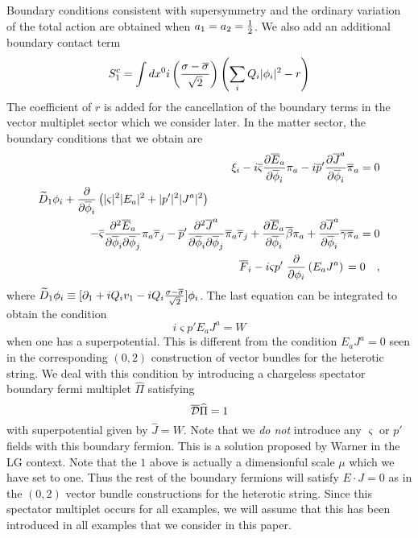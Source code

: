 \documentclass[a4paper,12pt]{article}
\begin{document}
Boundary conditions consistent with supersymmetry and the ordinary
variation of the total action are obtained when
$a_1=a_2={1\over2}$. We also add an additional boundary
contact term 
\begin{equation}
S_1^c = \int dx^0 i \left({{\sigma -
\overline{\sigma}}\over{\sqrt2}} \right) \left(\sum_i Q_i |\phi_i|^2
-r\right)
\end{equation}
The coefficient of $r$ is added for the
cancellation of the boundary terms in the vector multiplet sector which
we consider later.
In the matter sector, the boundary conditions that we obtain are
\begin{eqnarray}
&&\xi_i -i \overline{\varsigma}
{{\partial \overline{E}_a}\over{\partial\overline{\phi}_i}} \pi_a 
-i\overline{p}'{{\partial \overline{J}^a}\over{\partial\overline{\phi}_i}} 
\overline{\pi}_a =0 \label{genbca} \\
%
\lefteqn{
\widetilde{D}_1 \phi_i + {\partial\over{\partial\overline{\phi}_i}} 
\left( |\varsigma|^2|E_a|^2 + |p'|^2|J^a|^2\right) 
}\hspace{0.5in}
  \nonumber \\
&&- \overline{\varsigma}
{{\partial^2 \overline{E}_a}\over{\partial\overline{\phi}_i\partial\overline{\phi}_j}} 
\pi_a \overline{\tau}_j 
-\overline{p}'
{{\partial^2 \overline{J}^a}\over{\partial\overline{\phi}_i
\partial\overline{\phi}_j}} 
\overline{\pi}_a \overline{\tau}_j
+{{\partial \overline{E}_a}\over{\partial \overline{\phi}_i}}
\overline{\beta} \pi_a
+{{\partial \overline{J}^a}\over{\partial \overline{\phi}_i}}
\overline{\gamma}\overline{\pi}_a
=0  \label{genbcb}
\\
%
&&\overline{F}_i - i \varsigma p' \left.{\partial\over{\partial\phi_i}} \left({E}_a
{J}^a \right) \right.
=0 \quad,
\end{eqnarray}
where $\widetilde{D}_1 \phi_i \equiv [\partial_1 + iQ_i v_1 -iQ_i
{{\sigma-\overline{\sigma}}\over\sqrt2}]\phi_i$.
The last equation can be integrated to obtain the condition
\begin{equation}
i \varsigma p' E_a J^a = W
\end{equation}
when one has a superpotential. This is
different from the condition $E_a J^a =0$ seen in the
corresponding $(0,2)$ construction of vector bundles
for the heterotic string.  
We deal with this condition by introducing a chargeless spectator 
boundary fermi multiplet $\widehat{\Pi}$ satisfying
$$
\overline{\cal D} \widehat{\Pi} = 1
$$
with superpotential given by $\widehat{J}=W$.  Note that we {\it do not}
introduce any $\varsigma$ or $p'$ fields with this boundary fermion.
This is a solution proposed by Warner in the LG
context. Note that the $1$ above is actually a dimensionful scale $\mu$
which we have set to one. Thus the rest of the boundary fermions
will satisfy $E\cdot J=0$ as in the $(0,2)$ vector bundle
constructions for the heterotic string. Since this spectator multiplet
occurs for all examples, we will assume that this has been introduced
in all examples that we consider in this paper. 
\end{document}
